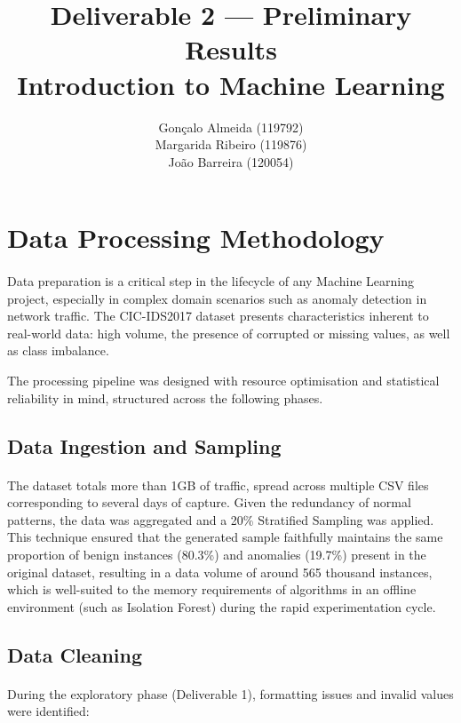 \documentclass[11pt]{article}
\title{\textbf{Deliverable 2 — Preliminary Results}\\
Introduction to Machine Learning}
\author{
Gonçalo Almeida (119792) \\
Margarida Ribeiro (119876) \\
João Barreira (120054)
}
\date{}
\begin{document}
\maketitle

\onehalfspacing

\section{Data Processing Methodology}

\paragraph{}Data preparation is a critical step in the lifecycle of any Machine Learning project, especially in complex domain scenarios such as anomaly detection in network traffic. The CIC-IDS2017 dataset presents characteristics inherent to real-world data: high volume, the presence of corrupted or missing values, as well as class imbalance.

The processing pipeline was designed with resource optimisation and statistical reliability in mind, structured across the following phases.

\subsection{Data Ingestion and Sampling}

\paragraph{}The dataset totals more than 1GB of traffic, spread across multiple CSV files corresponding to several days of capture. Given the redundancy of normal patterns, the data was aggregated and a 20\% Stratified Sampling was applied. This technique ensured that the generated sample faithfully maintains the same proportion of benign instances (80.3\%) and anomalies (19.7\%) present in the original dataset, resulting in a data volume of around 565 thousand instances, which is well-suited to the memory requirements of algorithms in an offline environment (such as Isolation Forest) during the rapid experimentation cycle.

\subsection{Data Cleaning}

\paragraph{}During the exploratory phase (Deliverable 1), formatting issues and invalid values were identified:
\end{document}
